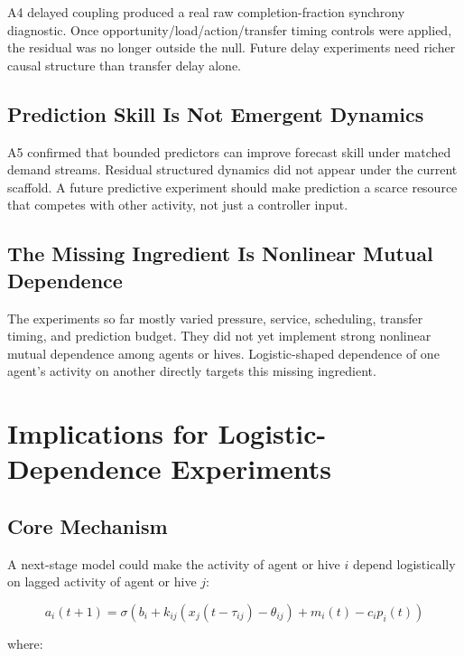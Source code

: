 \documentclass[11pt]{article}
\begin{document}
A4 delayed coupling produced a real raw completion-fraction synchrony
diagnostic. Once opportunity/load/action/transfer timing controls were applied,
the residual was no longer outside the null. Future delay experiments need
richer causal structure than transfer delay alone.

\subsection{Prediction Skill Is Not Emergent Dynamics}

A5 confirmed that bounded predictors can improve forecast skill under matched
demand streams. Residual structured dynamics did not appear under the current
scaffold. A future predictive experiment should make prediction a scarce
resource that competes with other activity, not just a controller input.

\subsection{The Missing Ingredient Is Nonlinear Mutual Dependence}

The experiments so far mostly varied pressure, service, scheduling, transfer
timing, and prediction budget. They did not yet implement strong nonlinear
mutual dependence among agents or hives. Logistic-shaped dependence of one
agent's activity on another directly targets this missing ingredient.

\section{Implications for Logistic-Dependence Experiments}

\subsection{Core Mechanism}

A next-stage model could make the activity of agent or hive $i$ depend
logistically on lagged activity of agent or hive $j$:

\[
a_i(t+1) =
\sigma\left(
  b_i
  + k_{ij}(x_j(t-\tau_{ij}) - \theta_{ij})
  + m_i(t)
  - c_i p_i(t)
\right)
\]

where:
\end{document}
